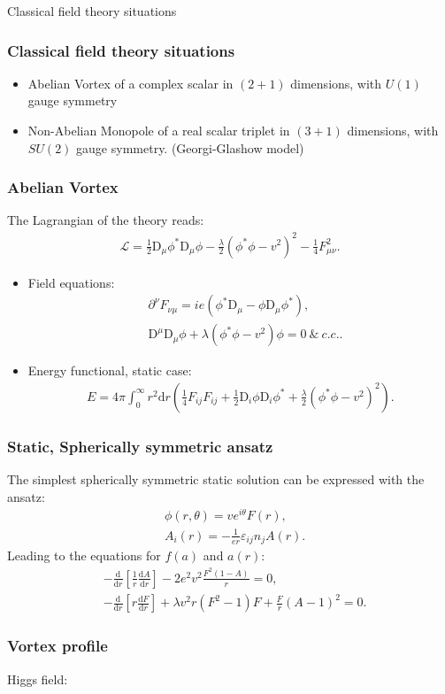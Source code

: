 \begin{section}{Classical field theory situations}
  \begin{frame}
    \frametitle{Classical field theory situations}
    \begin{itemize}
    \item Abelian Vortex of a complex scalar in $(2+1)$ dimensions,
      with $U(1)$ gauge symmetry
    \item Non-Abelian Monopole of a real scalar triplet in $(3+1)$
      dimensions, with $SU(2)$ gauge symmetry. (Georgi-Glashow model)
    \end{itemize}
  \end{frame}

  \begin{frame}
    \frametitle{Abelian Vortex}
    The Lagrangian of the  theory reads:
    \begin{align*}
      \mathcal L = \frac{1}{2}\mathrm D_\mu\phi^*\mathrm D_\mu\phi-\frac{\lambda}{2}(\phi^*\phi-v^2)^2-\frac{1}{4}F_{\mu\nu}^2.
    \end{align*}
    \begin{itemize}
    \item Field equations:
      \begin{align*}
        &\partial^\nu F_{\nu\mu}=ie(\phi^*\mathrm D_\mu-\phi\mathrm D_\mu\phi^*),\\
        &\mathrm D^\mu\mathrm D_\mu\phi+\lambda(\phi^*\phi-v^2)\phi=0\ \&\ c.c. .
      \end{align*}
    \item Energy functional, static case:
      \begin{align*}
        E = 4\pi\int_0^\infty r^2\mathrm d r\left(\frac{1}{4}F_{ij}F_{ij}+\frac{1}{2}\mathrm D_i\phi\mathrm D_i\phi^*+\frac{\lambda}{2}(\phi^*\phi-v^2)^2\right).
      \end{align*}
    \end{itemize}
  \end{frame}
  \begin{frame}
    \frametitle{Static, Spherically symmetric ansatz} The simplest
    spherically symmetric static solution can be expressed with the
    ansatz:
    \begin{align*}
      &\phi(r,\theta) = ve^{i\theta}F(r),\\
      &A_i(r) = -\frac{1}{er}\varepsilon_{ij}n_jA(r).
    \end{align*}
    Leading to the equations for $f(a)$ and $a(r)$:
    \begin{align*}
      &-\frac{\mathrm d}{\mathrm d r}\left[\frac{1}{r}\frac{\mathrm d A}{\mathrm dr}\right] -2e^2v^2\frac{F^2(1-A)}{r} = 0,\\
      &-\frac{\mathrm d}{\mathrm d r}\left[r\frac{\mathrm d F}{\mathrm dr}\right] +\lambda v^2 r(F^2-1)F+\frac{F}{r}(A-1)^2 = 0.
    \end{align*}
  \end{frame}
  \begin{frame}
    \frametitle{Vortex profile}
    Higgs field:
    
  \end{frame}


\end{section}
